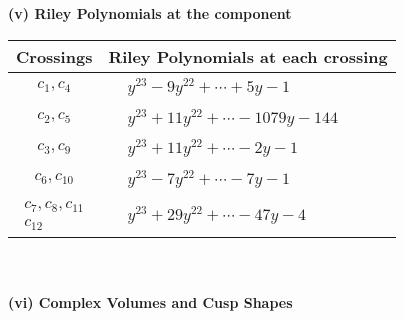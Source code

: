 \documentclass[1p]{elsarticle_modified}
\theoremstyle{definition}
\begin{document}
\newpage\renewcommand{\arraystretch}{1}
\flushleft \textbf{(v) Riley Polynomials at the component}\newline \\
\begin{tabular}{m{50pt}|m{274pt}}
Crossings & \hspace{64pt}Riley Polynomials at each crossing \\
\hline $$\begin{aligned}c_{1},c_{4}\end{aligned}$$&$\begin{aligned}
&y^{23}-9 y^{22}+\cdots+5 y-1
\end{aligned}$\\
\hline $$\begin{aligned}c_{2},c_{5}\end{aligned}$$&$\begin{aligned}
&y^{23}+11 y^{22}+\cdots-1079 y-144
\end{aligned}$\\
\hline $$\begin{aligned}c_{3},c_{9}\end{aligned}$$&$\begin{aligned}
&y^{23}+11 y^{22}+\cdots-2 y-1
\end{aligned}$\\
\hline $$\begin{aligned}c_{6},c_{10}\end{aligned}$$&$\begin{aligned}
&y^{23}-7 y^{22}+\cdots-7 y-1
\end{aligned}$\\
\hline $$\begin{aligned}c_{7},c_{8},c_{11}\\c_{12}\end{aligned}$$&$\begin{aligned}
&y^{23}+29 y^{22}+\cdots-47 y-4
\end{aligned}$\\
\hline
\end{tabular}\\~\\
\newpage\flushleft \textbf{(vi) Complex Volumes and Cusp Shapes}
\end{document}
